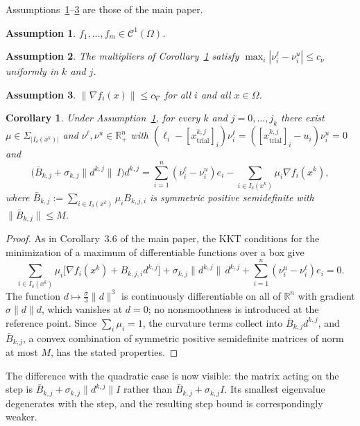 \documentclass[11pt]{article}
\newcommand{\xkjtrial}{x^{k,j}_{\mathrm{trial}}}
\newcommand{\dkj}{d^{k,j}}
\newtheorem{corollary}[theorem]{Corollary}
\newtheorem{assumption}{Assumption}
\begin{document}
Assumptions~\ref{a1}--\ref{a3} are those of the main paper.

\begin{assumption} \label{a1}
$f_1,\dots,f_m \in \mathcal{C}^1(\Omega)$.
\end{assumption}

\begin{assumption} \label{a2}
The multipliers of Corollary~\ref{cor:c-step} satisfy
$\max_i |\nu^\ell_i - \nu^u_i| \leq c_\nu$ uniformly in $k$ and $j$.
\end{assumption}

\begin{assumption} \label{a3}
$\|\nabla f_i(x)\| \leq c_\nabla$ for all $i$ and all $x \in \Omega$.
\end{assumption}

\begin{corollary} \label{cor:c-step}
Under Assumption~\ref{a1}, for every $k$ and $j = 0,\dots,j_k$ there exist
$\mu \in \Sigma_{|I_\delta(x^k)|}$ and $\nu^\ell,\nu^u \in \mathbb{R}^n_+$ with
$(\ell_i - [\xkjtrial]_i)\nu^\ell_i = ([\xkjtrial]_i - u_i)\nu^u_i = 0$ and
\begin{equation} \label{c-eqcoro}
\big( \bar{B}_{k,j} + \sigma_{k,j}\|\dkj\|\, I \big)\dkj
= \sum_{i=1}^n (\nu^\ell_i - \nu^u_i)e_i
- \sum_{i \in I_\delta(x^k)} \mu_i \nabla f_i(x^k),
\end{equation}
where $\bar{B}_{k,j} := \sum_{i \in I_\delta(x^k)} \mu_i B_{k,j,i}$ is
symmetric positive semidefinite with $\|\bar{B}_{k,j}\| \leq M$.
\end{corollary}

\begin{proof}
As in Corollary~3.6 of the main paper, the KKT conditions for the minimization
of a maximum of differentiable functions over a box give
\[
\sum_{i \in I_\delta(x^k)} \mu_i
\big[ \nabla f_i(x^k) + B_{k,j,i}\dkj \big]
+ \sigma_{k,j}\|\dkj\|\,\dkj
+ \sum_{i=1}^n (\nu^u_i - \nu^\ell_i)e_i = 0 .
\]
The function $d \mapsto \tfrac{\sigma}{3}\|d\|^3$ is continuously
differentiable on all of $\mathbb{R}^n$ with gradient $\sigma\|d\|d$, which
vanishes at $d = 0$; no nonsmoothness is introduced at the reference point.
Since $\sum_i \mu_i = 1$, the curvature terms collect into
$\bar{B}_{k,j}\dkj$, and $\bar{B}_{k,j}$, a convex combination of symmetric
positive semidefinite matrices of norm at most $M$, has the stated properties.
\end{proof}

The difference with the quadratic case is now visible: the matrix acting on the
step is $\bar{B}_{k,j} + \sigma_{k,j}\|\dkj\| I$ rather than
$\bar{B}_{k,j} + \sigma_{k,j} I$. Its smallest eigenvalue degenerates with the
step, and the resulting step bound is correspondingly weaker.
\end{document}
